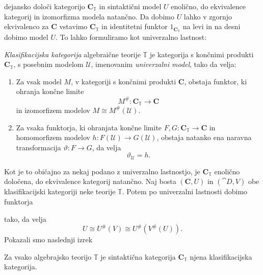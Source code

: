 \documentclass[../kategoricna_logika.tex]{subfiles}
\begin{document}
dejansko določi kategorijo $\mathbf{C}_{\mathbb{T}}$ in sintaktični model $U$ enolično,
do ekvivalence kategorij in izomorfizma modela natančno.
Da dobimo $U$ lahko v zgornjo ekvivalenco za $\mathbf{C}$ vstavimo $\mathbf{C}_{\mathbb{T}}$
in identitetni funktor $1_{\mathbf{C}_{\mathbb{T}}}$ na levi in na desni dobimo
model $U$. To lahko formuliramo kot univerzalno lastnost:
\begin{definicija}
  \emph{Klasifikacijska kategorija} algebraične teorije $\mathbb{T}$
  je kategorija s končnimi produkti $\mathbf{C}_\mathbb{T}$, s
  posebnim modelom $\mathcal{U}$, imenovanim \emph{univerzalni model},
  tako da velja:
  \begin{enumerate}
  \item Za vsak model $M$, v kategoriji s končnimi produkti
    $\mathbf{C}$, obstaja funktor, ki ohranja končne limite
    $$M^{\#} : \mathbf{C}_\mathbb{T} \to \mathbf{C}$$ in izomorfizem
    modelov $M \cong M^{\#}(\mathcal{U})$.
%
  \item Za vsaka funktorja, ki ohranjata končne limite
    $F,G : \mathbf{C}_\mathbb{T} \to \mathbf{C}$ in homomorfizem
    modelov $h: F(\mathcal{U}) \to G(\mathcal{U})$, obstaja natanko
    ena naravna transformacija $\vartheta : F \to G$, da velja
$$\vartheta_\mathcal{U} = h.$$
\end{enumerate}
\end{definicija}
Kot je to običajno za nekaj podano z univerzalno lastnostjo,
je $\mathbf{C}_\mathbb{T}$ enolično določena, do ekvivalence kategorij natančno.
%
Naj bosta $(\mathbf{C}, U)$ in $(\cat{D}, V)$ obe klasifikacijski
kategoriji neke teorije $\mathbb{T}$. Potem po univerzalni lastnosti
dobimo funktorja
\begin{center}
\end{center}
tako, da velja
$$U \cong U^{\#}(V) \cong U^{\#}(V^{\#}(U)).$$
Pokazali smo naslednji izrek
\begin{izrek}
\label{sec:klasifikacijska-kategorija-alg-teorije}
Za vsako algebrajsko teorijo $\mathbb{T}$ je sintaktična kategorija $\mathbf{C}_{\mathbb{T}}$
njena klasifikacijska kategorija.
\end{izrek}
\end{document}
